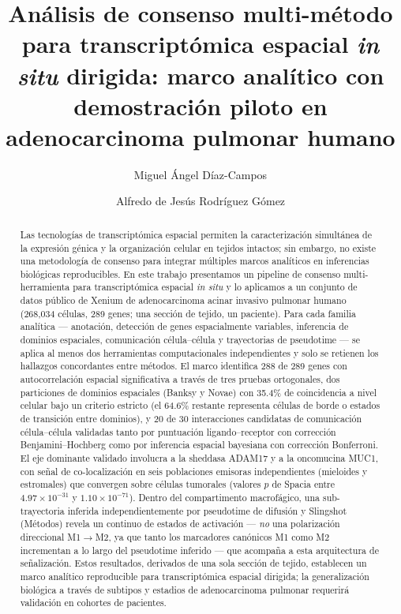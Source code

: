 \documentclass[12pt,a4paper]{article}
\title{\textbf{Análisis de consenso multi-método para transcriptómica espacial \textit{in situ} dirigida: marco analítico con demostración piloto en adenocarcinoma pulmonar humano}}
\author[1]{Miguel \'{A}ngel D\'{i}az-Campos}
\author[1,$\dagger$]{Alfredo de Jes\'{u}s Rodr\'{i}guez G\'{o}mez}
\affil[1]{Instituto Nacional de Pediatr\'{i}a (INP), Ciudad de M\'{e}xico, M\'{e}xico}
\affil[$\dagger$]{Autor de correspondencia: \href{mailto:alfredo.rodriguez@iibiomedicas.unam.mx}{alfredo.rodriguez@iibiomedicas.unam.mx}}
\date{}
\begin{document}
\maketitle

\begin{abstract}
Las tecnologías de transcriptómica espacial permiten la caracterización simultánea de la expresión génica y la organización celular en tejidos intactos; sin embargo, no existe una metodología de consenso para integrar múltiples marcos analíticos en inferencias biológicas reproducibles. En este trabajo presentamos un pipeline de consenso multi-herramienta para transcriptómica espacial \textit{in situ} y lo aplicamos a un conjunto de datos público de Xenium de adenocarcinoma acinar invasivo pulmonar humano (268,034 células, 289 genes; una sección de tejido, un paciente). Para cada familia analítica --- anotación, detección de genes espacialmente variables, inferencia de dominios espaciales, comunicación célula--célula y trayectorias de pseudotime --- se aplica al menos dos herramientas computacionales independientes y solo se retienen los hallazgos concordantes entre métodos. El marco identifica 288 de 289 genes con autocorrelación espacial significativa a través de tres pruebas ortogonales, dos particiones de dominios espaciales (Banksy y Novae) con 35.4\% de coincidencia a nivel celular bajo un criterio estricto (el 64.6\% restante representa células de borde o estados de transición entre dominios), y 20 de 30 interacciones candidatas de comunicación célula--célula validadas tanto por puntuación ligando--receptor con corrección Benjamini--Hochberg como por inferencia espacial bayesiana con corrección Bonferroni. El eje dominante validado involucra a la sheddasa ADAM17 y a la oncomucina MUC1, con señal de co-localización en seis poblaciones emisoras independientes (mieloides y estromales) que convergen sobre células tumorales (valores $p$ de Spacia entre $4.97 \times 10^{-31}$ y $1.10 \times 10^{-71}$). Dentro del compartimento macrofágico, una sub-trayectoria inferida independientemente por pseudotime de difusión y Slingshot (Métodos) revela un continuo de estados de activación --- \emph{no} una polarización direccional M1$\to$M2, ya que tanto los marcadores canónicos M1 como M2 incrementan a lo largo del pseudotime inferido --- que acompaña a esta arquitectura de señalización. Estos resultados, derivados de una sola sección de tejido, establecen un marco analítico reproducible para transcriptómica espacial dirigida; la generalización biológica a través de subtipos y estadios de adenocarcinoma pulmonar requerirá validación en cohortes de pacientes.
\end{abstract}
\end{document}
